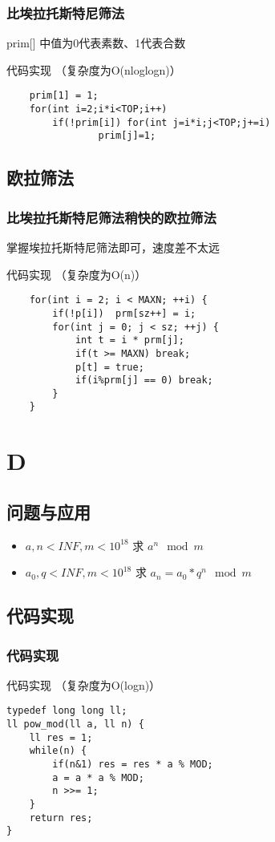 \documentclass{beamer}
\begin{document}
\begin{frame}[fragile]
\frametitle{比埃拉托斯特尼筛法}
prim[] 中值为0代表素数、1代表合数
\begin{block}{代码实现  （复杂度为O(nloglogn)）}
\begin{lstlisting}
    prim[1] = 1;
    for(int i=2;i*i<TOP;i++)
        if(!prim[i]) for(int j=i*i;j<TOP;j+=i)
                prim[j]=1;
\end{lstlisting}
\end{block}
\end{frame}

\subsection{欧拉筛法}
\begin{frame}[fragile]
\frametitle{比埃拉托斯特尼筛法稍快的欧拉筛法}
掌握埃拉托斯特尼筛法即可，速度差不太远
\begin{block}{代码实现  （复杂度为O(n)）}
\begin{lstlisting}
    for(int i = 2; i < MAXN; ++i) {
        if(!p[i])  prm[sz++] = i;
        for(int j = 0; j < sz; ++j) {
            int t = i * prm[j];
            if(t >= MAXN) break;
            p[t] = true;
            if(i%prm[j] == 0) break;
        }
    }
\end{lstlisting}
\end{block}
\end{frame}

\section{D}
\subsection{问题与应用}
\begin{frame}
\begin{itemize}
\item $a,n < INF, m < 10^{18}$ 求 $a^n \mod m$
\item $a_0, q < INF, m < 10^{18}$ 求 $a_n=a_0*q^n \mod m$
\end{itemize}
\end{frame}

\subsection{代码实现}
\begin{frame}[fragile]
\frametitle{代码实现}
\begin{block}{代码实现  （复杂度为O(logn)）}
\begin{lstlisting}
typedef long long ll;
ll pow_mod(ll a, ll n) {
    ll res = 1;
    while(n) {
        if(n&1) res = res * a % MOD;
        a = a * a % MOD;
        n >>= 1;
    }
    return res;
}
\end{lstlisting}
\end{block}
\end{frame}
\fi
\end{document}
